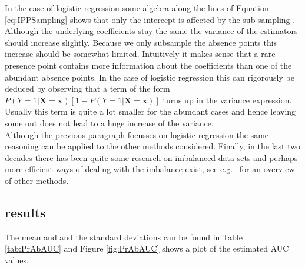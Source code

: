 In the case of logistic regression some algebra along the lines of Equation \ref{eq:IPPSampling} shows that only the intercept is affected by the sub-sampling \parencite{king_logistic_2001}. Although the underlying coefficients stay the same the variance of the estimators should increase slightly. Because we only subsample the absence points this increase should be somewhat limited. Intuitively it makes sense that a rare presence point contains more information about the coefficients than one of the abundant absence points. In the case of logistic regression this can rigorously be deduced by observing that a term of the form $P(Y=1|\bm{X} = \bm{x}) \left[1- P(Y=1|\bm{X} = \bm{x}) \right]$ turns up in the variance expression. Usually this term is quite a lot smaller for the abundant cases and hence leaving some out does not lead to a huge increase of the variance. \\ 

Although the previous paragraph focusses on logistic regression the same reasoning can be applied to the other methods considered. Finally, in the last two decades there has been quite some research on imbalanced data-sets and perhaps more efficient ways of dealing with the imbalance exist, see e.g.\ \cite{chawla2005data} for an overview of other methods. \\

\subsection{results}
\label{sec:sec:PAResults}
The mean and and the standard deviations can be found in Table \ref{tab:PrAbAUC} and Figure \ref{fig:PrAbAUC} shows a plot of the estimated AUC values. \\

